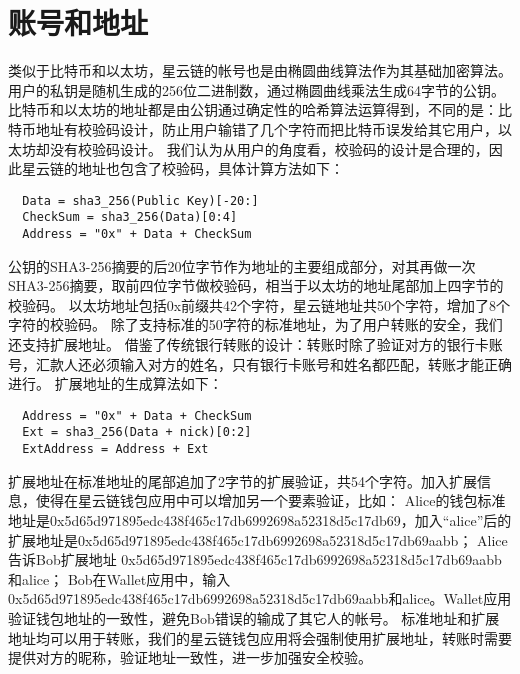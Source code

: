 \section{账号和地址}

类似于比特币和以太坊，星云链的帐号也是由椭圆曲线算法作为其基础加密算法。
用户的私钥是随机生成的256位二进制数，通过椭圆曲线乘法生成64字节的公钥。
比特币和以太坊的地址都是由公钥通过确定性的哈希算法运算得到，不同的是：比特币地址有校验码设计，防止用户输错了几个字符而把比特币误发给其它用户，以太坊却没有校验码设计。
我们认为从用户的角度看，校验码的设计是合理的，因此星云链的地址也包含了校验码，具体计算方法如下：

\begin{verbatim}
  Data = sha3_256(Public Key)[-20:]
  CheckSum = sha3_256(Data)[0:4]
  Address = "0x" + Data + CheckSum
\end{verbatim}

公钥的SHA3-256摘要的后20位字节作为地址的主要组成部分，对其再做一次SHA3-256摘要，取前四位字节做校验码，相当于以太坊的地址尾部加上四字节的校验码。
以太坊地址包括0x前缀共42个字符，星云链地址共50个字符，增加了8个字符的校验码。
	除了支持标准的50字符的标准地址，为了用户转账的安全，我们还支持扩展地址。
	借鉴了传统银行转账的设计：转账时除了验证对方的银行卡账号，汇款人还必须输入对方的姓名，只有银行卡账号和姓名都匹配，转账才能正确进行。
	扩展地址的生成算法如下：

\begin{verbatim}
  Address = "0x" + Data + CheckSum
  Ext = sha3_256(Data + nick)[0:2]
  ExtAddress = Address + Ext
\end{verbatim}

扩展地址在标准地址的尾部追加了2字节的扩展验证，共54个字符。加入扩展信息，使得在星云链钱包应用中可以增加另一个要素验证，比如：
Alice的钱包标准地址是0x5d65d971895edc438f465c17db6992698a52318d5c17db69，加入“alice”后的扩展地址是0x5d65d971895edc438f465c17db6992698a52318d5c17db69aabb；
Alice告诉Bob扩展地址 0x5d65d971895edc438f465c17db6992698a52318d5c17db69aabb和alice；
Bob在Wallet应用中，输入 0x5d65d971895edc438f465c17db6992698a52318d5c17db69aabb和alice。Wallet应用验证钱包地址的一致性，避免Bob错误的输成了其它人的帐号。
	标准地址和扩展地址均可以用于转账，我们的星云链钱包应用将会强制使用扩展地址，转账时需要提供对方的昵称，验证地址一致性，进一步加强安全校验。
